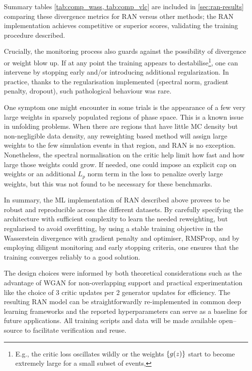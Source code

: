 {{        Summary tables \cref{tab:comp_wass, tab:comp_vlc} are included in \cref{sec:ran-results} comparing these divergence metrics for RAN versus other methods; the RAN implementation achieves competitive or superior scores, validating the training procedure described.

        Crucially, the monitoring process also guards against the possibility of divergence or weight blow up.
        If at any point the training appears to destabilise\footnote{E.g., the critic loss oscillates wildly or the weights $\qty{g(z)}$ start to become extremely large for a small subset of events,}, one can intervene by stopping early and/or introducing additional regularization.
        In practice, thanks to the regularisation implemented (spectral norm, gradient penalty, dropout), such pathological behaviour was rare.
        
        One symptom one might encounter in some trials is the appearance of a few very large weights in sparsely populated regions of phase space.
        This is a known issue in unfolding problems.
        When there are regions that have little MC density but non-negligible data density, any reweighting based method will assign large weights to the few simulation events in that region, and RAN is no exception.
        Nonetheless, the spectral normalisation on the critic help limit how fast and how large those weights could grow.
        If needed, one could impose an explicit cap on weights or an additional \(L_p\) norm term in the loss to penalize overly large weights, but this was not found to be necessary for these benchmarks.

    In summary, the ML implementation of RAN described above provees to be robust and reproducible across the different datasets.
    By carefully specifying the architecture with sufficient complexity to learn the needed reweighting, but regularised to avoid overfitting, by using a stable training objective in the Wasserstein divergence with gradient penalty and optimiser, RMSProp, and by employing diligent monitoring and early stopping criteria, one ensures that the training converges reliably to a good solution.
    
    The design choices were informed by both theoretical considerations such as the advantage of WGAN for non-overlapping support and practical experimentation like the choice of 3 critic updates per 2 generator updates for efficiency.
    The resulting RAN model can be straightforwardly re-implemented in common deep learning frameworks and the reported hyperparameters can serve as a baseline for future applications.
    All training scripts and data will be made available open--source to facilitate verification and reuse.

}}
